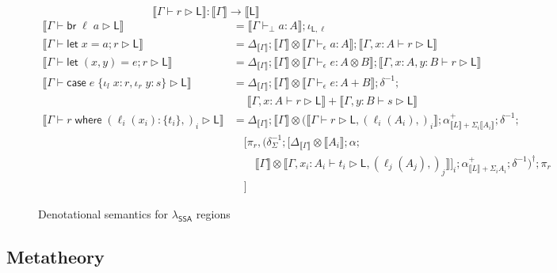 \documentclass[acmsmall,screen,review]{acmart}
\newcommand{\ms}[1]{\ensuremath{\mathsf{#1}}}
\newcommand{\lto}{:}
\newcommand{\linl}[1]{\iota_l\;{#1}}
\newcommand{\linr}[1]{\iota_r\;{#1}}
\newcommand{\letstmt}[3]{\ensuremath{\ms{let}\;#1 = #2; #3}}
\newcommand{\brb}[2]{\ms{br}\;#1\;#2}
\newcommand{\casestmt}[5]{\ms{case}\;#1\;\{\linl{#2} \lto #3, \linr{#4} \lto #5\}}
\newcommand{\where}[2]{#1\;\ms{where}\;#2}
\newcommand{\wbranch}[3]{#1(#2) \lto \{#3\}}
\newcommand{\bhyp}[2]{#1 : #2}
\newcommand{\lhyp}[2]{#1(#2)}
\newcommand{\hasty}[4]{#1 \vdash_{#2} #3: {#4}}
\newcommand{\haslb}[3]{#1 \vdash #2 \rhd #3}
\newcommand{\dnt}[1]{\llbracket{#1}\rrbracket}
\newcommand{\isotopessa}{\(\lambda_{\ms{SSA}}\)}
\begin{document}
\begin{figure}
  \begin{equation*}
    \boxed{\dnt{\haslb{\Gamma}{r}{\ms{L}}} : \dnt{\Gamma} \to \dnt{\ms{L}}}
  \end{equation*}
  \begin{align*}
    \dnt{\haslb{\Gamma}{\brb{\ell}{a}}{\ms{L}}} 
      &= \dnt{\hasty{\Gamma}{\bot}{a}{A}} ; \iota_{\ms{L}, \ell}
      \\
    \dnt{\haslb{\Gamma}{\letstmt{x}{a}{r}}{\ms{L}}}
      &= \Delta_{\dnt{\Gamma}}
      ; \dnt{\Gamma} \otimes \dnt{\hasty{\Gamma}{\epsilon}{a}{A}}
      ; \dnt{\haslb{\Gamma, \bhyp{x}{A}}{r}{\ms{L}}} 
      \\
    \dnt{\haslb{\Gamma}{\letstmt{(x, y)}{e}{r}}{\ms{L}}}
      &= \Delta_{\dnt{\Gamma}}
      ; \dnt{\Gamma} \otimes \dnt{\hasty{\Gamma}{\epsilon}{e}{A \otimes B}}
      ; \dnt{\haslb{\Gamma, \bhyp{x}{A}, \bhyp{y}{B}}{r}{\ms{L}}} 
      \\ 
    \dnt{\haslb{\Gamma}{\casestmt{e}{x}{r}{y}{s}}{\ms{L}}}
      &= \Delta_{\dnt{\Gamma}}
      ; \dnt{\Gamma} \otimes \dnt{\hasty{\Gamma}{\epsilon}{e}{A + B}}
      ; \delta^{-1} ;
      \\&\quad\;
      \dnt{\haslb{\Gamma, \bhyp{x}{A}}{r}{\ms{L}}}
      + \dnt{\haslb{\Gamma, \bhyp{y}{B}}{s}{\ms{L}}}
      \\
    \dnt{\haslb{\Gamma}{\where{r}{(\wbranch{\ell_i}{x_i}{t_i},)_i}}{\ms{L}}}
      &=  
      \Delta_{\dnt{\Gamma}}
      ; \dnt{\Gamma} \otimes (\dnt{\haslb{\Gamma}{r}{\ms{L}, (\lhyp{\ell_i}{A_i},)_i}} 
      ; \alpha^+_{\dnt{L} + \Sigma_i \dnt{A_i}} ; \delta^{-1} ; 
      \\ &\quad [\pi_r, 
        (\delta^{-1}_{\Sigma} ;
          [ 
            \Delta_{\dnt{\Gamma}} \otimes \dnt{A_i} ; \alpha ;
      \\ & \qquad
            \dnt{\Gamma} \otimes 
            \dnt{\haslb{\Gamma, \bhyp{x_i}{A_i}}{t_i}{\ms{L}, (\lhyp{\ell_j}{A_j},)_j}}
          ]_i ; \alpha^+_{\dnt{L} + \Sigma_i A_i} ; \delta^{-1}
        )^\dagger ; \pi_r
      \\ & \quad ]
  \end{align*}
  \caption{Denotational semantics for \isotopessa{} regions}
  \label{fig:ssa-reg-sem}
\end{figure}

\subsection{Metatheory}
\end{document}
